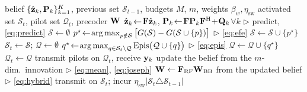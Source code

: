\begin{algorithm}[t]
\caption{Active inference for joint port selection and pilot allocation (slot $t$)}
\label{alg:aif}
\begin{algorithmic}[1]
\REQUIRE belief $\{\hat{\mathbf{z}}_k,\mathbf{P}_k\}_{k=1}^{K}$, previous set
         $\mathcal{S}_{t-1}$, budgets $M$, $m$, weights
         $\beta_w,\eta_{\mathrm{sw}}$
\ENSURE  activated set $\mathcal{S}_t$, pilot set $\mathcal{Q}_t$, precoder $\mathbf{W}$
\STATE $\hat{\mathbf{z}}_k\!\leftarrow\!\mathbf{F}\hat{\mathbf{z}}_k$,\;
       $\mathbf{P}_k\!\leftarrow\!\mathbf{F}\mathbf{P}_k\mathbf{F}^{\mathrm{H}}\!+\!\mathbf{Q}_k$\;$\forall k$
       \hfill $\triangleright$ predict, \eqref{eq:predict}
\STATE $\mathcal{S}\leftarrow\emptyset$
  \STATE $p^{\star}\!\leftarrow\!\operatorname*{arg\,max}_{p\notin\mathcal{S}}
         \big[G(\mathcal{S})-G(\mathcal{S}\cup\{p\})\big]$
         \hfill $\triangleright$ \eqref{eq:efe}
  \STATE $\mathcal{S}\leftarrow\mathcal{S}\cup\{p^{\star}\}$
\ENDFOR
\STATE $\mathcal{S}_t\leftarrow\mathcal{S}$;\;\; $\mathcal{Q}\leftarrow\emptyset$
  \STATE $q^{\star}\!\leftarrow\!\operatorname*{arg\,max}_{q\in\mathcal{S}_t\setminus\mathcal{Q}}
         \mathrm{Epis}\big(\mathcal{Q}\cup\{q\}\big)$
         \hfill $\triangleright$ \eqref{eq:epis}
  \STATE $\mathcal{Q}\leftarrow\mathcal{Q}\cup\{q^{\star}\}$
\ENDFOR
\STATE $\mathcal{Q}_t\leftarrow\mathcal{Q}$
\STATE transmit pilots on $\mathcal{Q}_t$, receive $\mathbf{y}_k$
\STATE update the belief from the $m$-dim.\ innovation
       \hfill $\triangleright$ \eqref{eq:mean}, \eqref{eq:joseph}
\STATE $\mathbf{W}\leftarrow\mathbf{F}_{\mathrm{RF}}\mathbf{W}_{\mathrm{BB}}$ from the updated belief
       \hfill $\triangleright$ \eqref{eq:hybrid}
\STATE transmit on $\mathcal{S}_t$; incur
       $\eta_{\mathrm{sw}}|\mathcal{S}_t\triangle\mathcal{S}_{t-1}|$
\end{algorithmic}
\end{algorithm}
